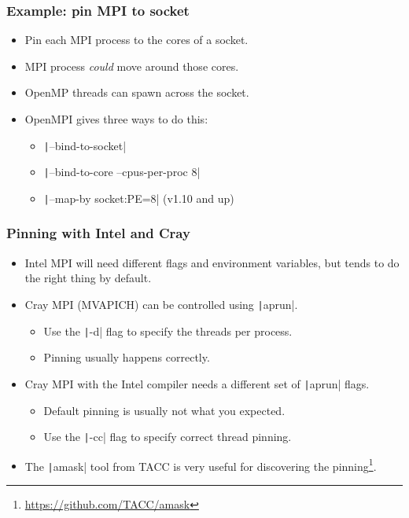 \documentclass{beamer}
\begin{document}
\begin{frame}
\frametitle{Example: pin MPI to socket}
\begin{itemize}
  \item Pin each MPI process to the cores of a socket.
  \item MPI process \emph{could} move around those cores.
  \item OpenMP threads can spawn across the socket.
  \item OpenMPI gives three ways to do this:
  \begin{itemize}
    \item \texttt|--bind-to-socket|
    \item \texttt|--bind-to-core --cpus-per-proc 8|
    \item \texttt|--map-by socket:PE=8| (v1.10 and up)
  \end{itemize}
\end{itemize}
\end{frame}

\begin{frame}
\frametitle{Pinning with Intel and Cray}
\begin{itemize}
  \item Intel MPI will need different flags and environment variables, but tends to do the right thing by default.
  \item Cray MPI (MVAPICH) can be controlled using \texttt|aprun|.
    \begin{itemize}
      \item Use the \texttt|-d| flag to specify the threads per process.
      \item Pinning usually happens correctly.
    \end{itemize}
  \item Cray MPI with the Intel compiler needs a different set of \texttt|aprun| flags.
    \begin{itemize}
      \item Default pinning is usually not what you expected.
      \item Use the \texttt|-cc| flag to specify correct thread pinning.
    \end{itemize}
  \item The \texttt|amask| tool from TACC is very useful for discovering the pinning\footnote{\url{https://github.com/TACC/amask}}.
\end{itemize}
\end{frame}
\end{document}

